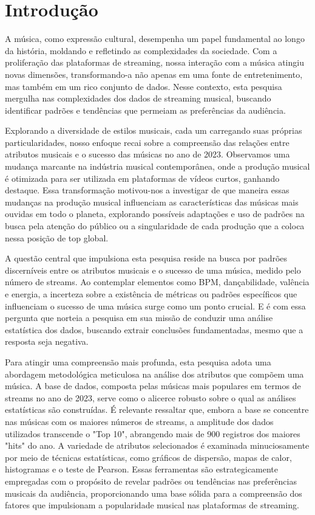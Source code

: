 \documentclass[12pt]{article}
\begin{document}
\section{Introdução}

A música, como expressão cultural, desempenha um papel fundamental ao longo da história, moldando e refletindo as complexidades da sociedade. Com a proliferação das plataformas de streaming, nossa interação com a música atingiu novas dimensões, transformando-a não apenas em uma fonte de entretenimento, mas também em um rico conjunto de dados. Nesse contexto, esta pesquisa mergulha nas complexidades dos dados de streaming musical, buscando identificar padrões e tendências que permeiam as preferências da audiência\cite{spotify-analysis}.

Explorando a diversidade de estilos musicais, cada um carregando suas próprias particularidades, nosso enfoque recai sobre a compreensão das relações entre atributos musicais e o sucesso das músicas no ano de 2023. Observamos uma mudança marcante na indústria musical contemporânea, onde a produção musical é otimizada para ser utilizada em plataformas de vídeos curtos, ganhando destaque. Essa transformação motivou-nos a investigar de que maneira essas mudanças na produção musical influenciam as características das músicas mais ouvidas em todo o planeta, explorando possíveis adaptações e uso de padrões na busca pela atenção do público ou a singularidade de cada produção que a coloca nessa posição de top global.

A questão central que impulsiona esta pesquisa reside na busca por padrões discerníveis entre os atributos musicais e o sucesso de uma música, medido pelo número de streams. Ao contemplar elementos como BPM, dançabilidade, valência e energia, a incerteza sobre a existência de métricas ou padrões específicos que influenciam o sucesso de uma música surge como um ponto crucial\cite{spotify-analysis}. E é com essa pergunta que norteia a pesquisa em sua missão de conduzir uma análise estatística dos dados, buscando extrair conclusões fundamentadas, mesmo que a resposta seja negativa.

Para atingir uma compreensão mais profunda, esta pesquisa adota uma abordagem metodológica meticulosa na análise dos atributos que compõem uma música. A base de dados, composta pelas músicas mais populares em termos de streams no ano de 2023, serve como o alicerce robusto sobre o qual as análises estatísticas são construídas\cite{kaggle-spotify}. É relevante ressaltar que, embora a base se concentre nas músicas com os maiores números de streams, a amplitude dos dados utilizados transcende o "Top 10", abrangendo mais de 900 registros dos maiores "hits" do ano. A variedade de atributos selecionados é examinada minuciosamente por meio de técnicas estatísticas, como gráficos de dispersão, mapas de calor, histogramas e o teste de Pearson. Essas ferramentas são estrategicamente empregadas com o propósito de revelar padrões ou tendências nas preferências musicais da audiência, proporcionando uma base sólida para a compreensão dos fatores que impulsionam a popularidade musical nas plataformas de streaming.
\end{document}
